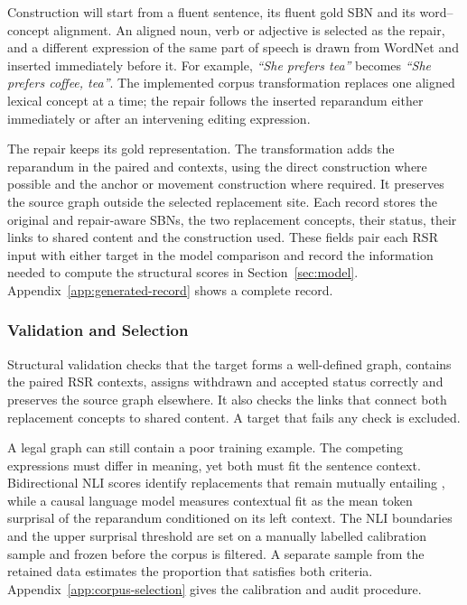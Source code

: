 Construction will start from a fluent sentence, its fluent gold SBN and its word--concept
alignment. An aligned noun, verb or adjective is selected as the repair, and a
different expression of the same part of speech is drawn from WordNet
\citep{millerWordNetLexicalDatabase1994} and inserted immediately before it.
For example, \textit{``She prefers tea''} becomes \textit{``She prefers
coffee, tea''}. The implemented corpus transformation replaces one aligned
lexical concept at a time; the repair follows the inserted reparandum either
immediately or after an intervening editing expression.

The repair keeps its gold representation. The transformation adds the
reparandum in the paired  and 
contexts, using the direct construction where possible and the anchor or
movement construction where required. It preserves the source graph
outside the selected replacement site. Each record stores the original and
repair-aware SBNs, the two replacement concepts, their status, their links to
shared content and the construction used. These fields pair each RSR input
with either target in the model comparison and record the information needed
to compute the structural scores in Section~\ref{sec:model}.
Appendix~\ref{app:generated-record}
shows a complete record.

\subsubsection{Validation and Selection}

Structural validation checks that the target forms a well-defined graph,
contains the paired RSR contexts, assigns withdrawn and accepted status
correctly and preserves the source graph elsewhere. It also checks the links
that connect both replacement concepts to shared content. A target that fails
any check is excluded.

A legal graph can still contain a poor training example. The competing
expressions must differ in meaning, yet both must fit the sentence context.
Bidirectional NLI scores identify replacements that remain mutually entailing
\citep{laurerLessAnnotatingMore2024}, while a causal language model measures
contextual fit as the mean token surprisal of the reparandum conditioned on
its left context. The NLI boundaries and the upper surprisal threshold are set
on a manually labelled calibration sample and frozen before the corpus is filtered. A separate sample
from the retained data estimates the proportion that satisfies both criteria.
Appendix~\ref{app:corpus-selection} gives the calibration and audit procedure.

